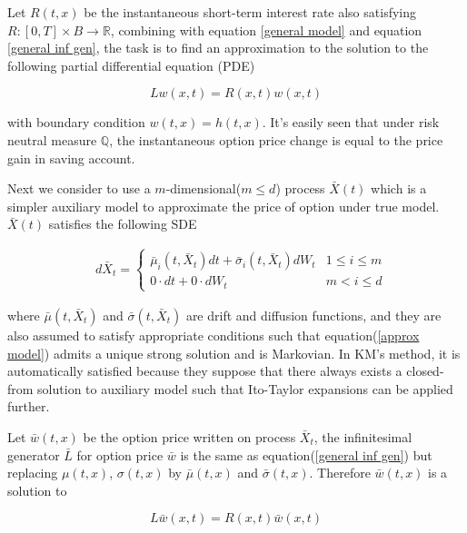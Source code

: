 Let $R(t,x)$ be the instantaneous short-term interest rate also satisfying $R:[0,T] \times B \rightarrow \mathbb R$, combining with equation \eqref{general model} and equation \eqref{general inf gen}, the task is to find an approximation to the solution to the following partial differential equation (PDE)

\begin{equation}\label{pde under general}
    Lw(x,t) = R(x,t)w(x,t)
\end{equation}

\noindent with boundary condition $w(t,x) = h(t,x)$. It's easily seen that under risk neutral measure $\mathbb Q$, the instantaneous option price change is equal to the price gain in saving account. 

Next we consider to use a $m$-dimensional($m \leq d$) process $\bar{X}(t)$ which is a simpler auxiliary model to approximate the price of option under true model. $\bar{X}(t)$ satisfies the following SDE

\begin{equation}\label{approx model}
    \begin{aligned}
        &d\bar{X}_t= \begin{cases}   \bar{\mu}_i(t, \bar{X}_t) dt + \bar{\sigma}_i(t, \bar{X}_t) dW_t & 1 \leq i \leq m \\
        0 \cdot dt + 0 \cdot dW_t & m < i \leq d \end{cases}
        \end{aligned}
\end{equation}

\noindent where $\bar{\mu}(t, \bar{X}_t)$ and $\bar{\sigma}(t, \bar{X}_t)$ are drift and diffusion functions, and they are also assumed to satisfy appropriate conditions such that equation(\ref{approx model}) admits a unique strong solution and is Markovian. In KM's method, it is automatically satisfied because they suppose that there always exists a closed-from solution to auxiliary model such that Ito-Taylor expansions can be applied further.

Let $\bar{w}(t,x)$ be the option price written on process $\bar{X}_t$, the infinitesimal generator $\bar{L}$ for option price $\bar{w}$ is the same as equation(\ref{general inf gen}) but replacing $\mu(t,x)$, $\sigma(t,x)$ by $\bar{\mu}(t,x)$ and $\bar{\sigma}(t,x)$. Therefore $\bar{w}(t,x)$ is a solution to

\begin{equation}\label{pde under approx}
    L \bar{w}(x,t) = R(x,t)\bar{w}(x,t)
\end{equation}

